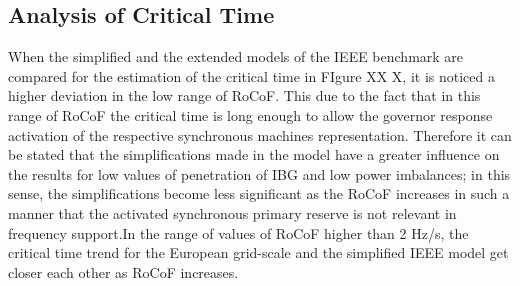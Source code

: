 
\subsection{Analysis of Critical Time}


When the simplified and the extended models of the IEEE benchmark are compared for the estimation of the critical time in FIgure XX X, it is noticed a higher deviation in the low range of RoCoF. This due to the fact that in this range of RoCoF the critical time is long enough to allow the governor response activation of the respective synchronous machines representation. Therefore it can be stated that the simplifications made in the model have a greater influence on the results for low values of penetration of IBG and low power imbalances; in this sense, the simplifications become less significant as the RoCoF increases in such a manner that the activated synchronous primary reserve is not relevant in frequency support.In the range of values of RoCoF higher than 2 Hz/s, the critical time trend for the European grid-scale and the simplified IEEE model get closer each other as RoCoF increases.\\


